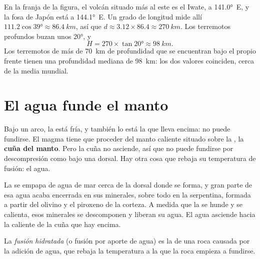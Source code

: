 \begin{example}\label{ex:g12:subduction-magmatism:japan}
En la franja de la figura, el volcán situado más al este es el Iwate, a
\ang{141.0}~E, y la fosa de Japón está a \ang{144.1}~E. Un grado de longitud
mide allí $111.2\cos\ang{39} \approx \qty{86.4}{km}$, así que $d \approx 3.12 \times 86.4
\approx \qty{270}{km}$. Los terremotos profundos buzan unos \ang{20}, y
\[
  H = 270 \times \tan\ang{20} \approx \qty{98}{km}.
\]
Los terremotos de más de \qty{70}{km} de profundidad que se encuentran bajo el
propio frente tienen una profundidad mediana de \qty{98}{km}: los dos valores
coinciden, cerca de la media mundial.
\end{example}

\section{El agua funde el manto}

Bajo un arco, la  está fría, y también lo está la  que
lleva encima: no puede fundirse. El magma tiene que proceder del manto
caliente situado sobre la , la \textbf{cuña del manto}. Pero la cuña no
asciende, así que no puede fundirse por descompresión como bajo una dorsal.
Hay otra cosa que rebaja su temperatura de fusión: el agua.

La  se empapa de agua de mar cerca de la dorsal donde se
forma, y gran parte de esa agua acaba encerrada en sus minerales, sobre todo
en la serpentina, formada a partir del olivino y el piroxeno de la corteza. A
medida que la  se hunde y se calienta, esos minerales se descomponen y
liberan su agua. El agua asciende hacia la  caliente de la cuña que
hay encima.

\begin{definition}\label{def:g12:subduction-magmatism:hydrous-melting}
La \emph{fusión hidratada} (o fusión por
aporte de agua) es la  de una roca causada por la adición de
agua, que rebaja la temperatura a la que la roca empieza a fundirse.
\end{definition}

